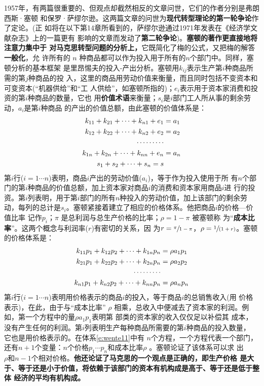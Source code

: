 1957年，有两篇很重要的、但观点却截然相反的文章问世，它们的作者分别是弗朗西斯·塞顿
和保罗·萨缪尔逊。这两篇文章的问世为\textbf{现代转型理论的第一轮争论}作了定论。(正
如将在以下第14章所看到的，萨缪尔逊通过1971年发表在《经济学文献杂志》上的一篇更有
影响的文章而发动了\textbf{第二轮争论})。\textbf{塞顿的著作更直接地将注意力集中于
  对马克思转型问题的分析上，}它既简化了梅的公式，又把梅的解答\textbf{一般化}，允
许所有的 $n$ 种商品都可以作为投入用于所有的$n$个部门中。同样，塞顿分析的基本框架
是里昂惕夫的投入-产出分析。塞顿用$k_{ij}$表示生产第$i$种商品所需的第$j$种商品的投
入，这里的商品用劳动价值来衡量，而且同时包括不变资本和可变资本(“机器供给”和“工
人供给”，如塞顿所指的)；$e_i$表示用于资本家消费和投资的第$i$种商品的数量，它也
用\textbf{价值术语}来衡量；$s_i$是$i$部门工人所从事的剩余劳动，$a_i$是第$i$种商品
的产出的价值总额，由此塞顿的价值体系是：
\begin{align}
k_{11}+k_{21}+ \cdots + k_{n1}+e_1 &=a_1 \label{e:wente10} \\
k_{12}+k_{22}+ \cdots + k_{n2}+e_2 &=a_2  \notag \\
  \cdots \cdots \cdots \notag \\
k_{1n}+k_{2n}+ \cdots + k_{nn}+e_n &=a_n \notag \\
s_1+s_2+ \cdots + s_n=s  \notag
\end{align}
第$i$行($i=1 \cdots n$)表明，商品$i$产出的劳动价值($a_i$)，等于作为投入使用于所
有$n$个部门的第$i$种商品的价值总额，加上资本家对商品$i$的消费和资本家用商品$i$进
行的投资。第$i$列表明，用于第$i$部门的所有$n$种投入的劳动价值，加上该部门的剩余劳
动，每列的总计是$s_i$。塞顿紧接着建立了相应的价格体系。他把商品$i$的价格—价值比率
记作$p_i$；$\pi$ 是总利润与总生产价格的比率；$\rho =1- \pi$ 被塞顿称
为“\textbf{成本比率}”。这两个概念与利润率($r$)有密切的关系，因
为$r=\sfrac{\pi}{1-\pi}$，$\rho =\sfrac{1}{(1+r)}$。塞顿的价格体系是：
\begin{align}
k_{11}p_1+k_{12}p_2+ \cdots + k_{1n}p_n&=\rho a_1p_1  \label{e:wente11}\\
k_{21}p_1+k_{22}p_2+ \cdots + k_{2n}p_n&=\rho a_2p_2 \notag \\
\cdots \cdots \cdots \notag \\
k_{n1}p_1+k_{n2}p_2+ \cdots + k_{nn}p_n&=\rho a_np_n \notag
\end{align}
第$i$行($i=1 \cdots n$)表明用价格表示的商品$i$的投入，等于商品$i$的总销售收入(用
价格表示)，在此，由于与“成本比率” $\rho$ 相乘，总收入中便减去了资本家的利润。例
如，第一个方程中的量$\rho a_1p_1$表明第 部类的资本家的收入仅仅足以补偿其
成本，没有产生任何的利润。第$i$列表明生产每种商品所需要的第$i$种商品的投入数量，
它也是用价格表示的。在体系\eqref{e:wente11}中有 $n$个方程，一个方程代表一个部门，
还有$n+1$个变量：$n个价格p_1 \cdots p_n$和成本比率$\rho$ 。塞顿论证了该体系可以求
出$\rho 和n-1$个相对价格。\textbf{他还论证了马克思的一个观点是正确的，即生产价格
  是大于、等于还是小于价值，将依赖于该部门的资本有机构成是高于、等于还是低于整体
  经济的平均有机构成。}

